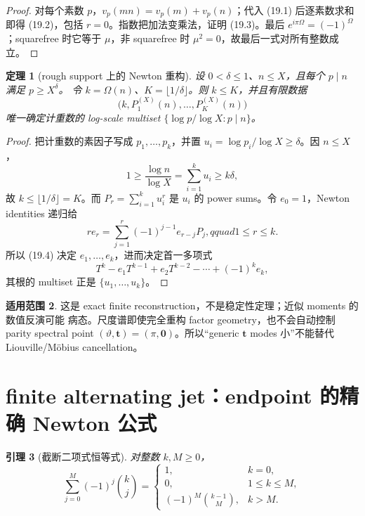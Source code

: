 \documentclass[11pt,a4paper]{ctexart}
\newtheorem{theorem}{定理}[section]
\newtheorem{lemma}[theorem]{引理}
\theoremstyle{definition}
\newtheorem{remark}[theorem]{适用范围}
\newcommand{\1}{\mathbf 1}
\begin{document}
\begin{proof}
对每个素数 $p$，$v_p(mn)=v_p(m)+v_p(n)$；代入 (19.1) 后逐素数求和即得
(19.2)，包括 $r=0$。指数把加法变乘法，证明 (19.3)。最后
$e^{i\pi\Omega}=(-1)^\Omega$；squarefree 时它等于 $\mu$，非 squarefree
时 $\mu^2=0$，故最后一式对所有整数成立。
\end{proof}

\begin{theorem}[rough support 上的 Newton 重构]\label{thm:tool-newton}
设 $0<\delta\le1$、$n\le X$，且每个 $p\mid n$ 满足 $p\ge X^\delta$。
令 $k=\Omega(n)$、$K=\lfloor1/\delta\rfloor$。则 $k\le K$，并且有限数据
\[
\boxed{\bigl(k,P_1^{(X)}(n),\ldots,P_K^{(X)}(n)\bigr)} \tag{19.4}
\]
唯一确定计重数的 log-scale multiset
$\{\log p/\log X:p\mid n\}$。
\end{theorem}

\begin{proof}
把计重数的素因子写成 $p_1,\ldots,p_k$，并置
$u_i=\log p_i/\log X\ge\delta$。因 $n\le X$，
\[
1\ge\frac{\log n}{\log X}=\sum_{i=1}^ku_i\ge k\delta,
\]
故 $k\le\lfloor1/\delta\rfloor=K$。而
$P_r=\sum_{i=1}^ku_i^r$ 是 $u_i$ 的 power sums。令 $e_0=1$，Newton identities
递归给
\[
re_r=\sum_{j=1}^r(-1)^{j-1}e_{r-j}P_j,qquad1\le r\le k. \tag{19.5}
\]
所以 (19.4) 决定 $e_1,\ldots,e_k$，进而决定首一多项式
\[
T^k-e_1T^{k-1}+e_2T^{k-2}-\cdots+(-1)^ke_k,
\]
其根的 multiset 正是 $\{u_1,\ldots,u_k\}$。
\end{proof}

\begin{remark}
这是 exact finite reconstruction，不是稳定性定理；近似 moments 的数值反演可能
病态。尺度谱即使完全重构 factor geometry，也不会自动控制 parity spectral point
$(\vartheta,\mathbf t)=(\pi,\mathbf0)$。所以“generic $\mathbf t$ modes 小”不能替代
Liouville/Möbius cancellation。
\end{remark}

\section{finite alternating jet：endpoint 的精确 Newton 公式}

\begin{lemma}[截断二项式恒等式]\label{lem:tool-binomial}
对整数 $k,M\ge0$，
\[
\sum_{j=0}^M(-1)^j\binom kj
=\begin{cases}
1,&k=0,\\
0,&1\le k\le M,\\
(-1)^M\binom{k-1}{M},&k>M.
\end{cases}                                           \tag{20.1}
\]
\end{lemma}
\end{document}

